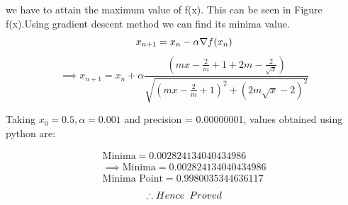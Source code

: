 \documentclass[10pt, a4paper]{article}
\begin{document}
we have to attain the maximum value of f(x). This can be seen in Figure f(x).Using gradient descent method we can find its minima value.
\begin{equation}
        x_{n+1} = x_n - \alpha \nabla f(x_n) \\
\end{equation}
\vspace{1mm}
\begin{equation}
\implies x_{n+1}=x_n+\alpha\frac{(mx-\frac{2}{m}+1+2m-\frac{2}{\sqrt{x}})}{\sqrt{(mx-\frac{2}{m}+1)^2+(2m\sqrt{x}-2)^2}}
\end{equation}

Taking $x_0=0.5,\alpha=0.001$ and precision = 0.00000001, values obtained using python are:
    

    \begin{align}
        \text{Minima} = 0.002824134040434986\\
        \implies \boxed{\text{Minima} = 0.002824134040434986}\\
        \boxed{\text{Minima Point} = 0.9980035344636117}
    \end{align}
    \begin{align*}
    \therefore  Hence\hspace{0.5em}Proved 
    \end{align*} 
   
\end{document}
